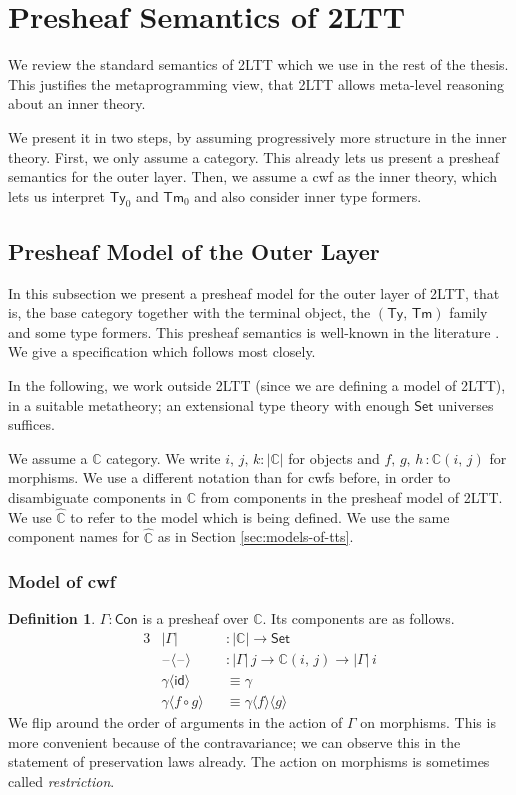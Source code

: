 \documentclass[12pt,a4paper,twoside,openany]{book}
\theoremstyle{remark}
\theoremstyle{definition}
\newtheorem{mydefinition}{Definition}
\theoremstyle{theorem}
\newcommand{\mbb}[1]{\mathbb{#1}}
\newcommand{\id}{\mathsf{id}}
\newcommand{\Con}{\mathsf{Con}}
\newcommand{\Tm}{\mathsf{Tm}}
\newcommand{\Ty}{\mathsf{Ty}}
\newcommand{\blank}{\mathord{\hspace{1pt}\text{--}\hspace{1pt}}}
\newcommand{\Set}{\mathsf{Set}}
\newcommand{\mbbC}{\mbb{C}}
\newcommand{\hmbbC}{\hat{\mbb{C}}}
\newcommand{\lab}{\langle}
\newcommand{\rab}{\rangle}
\begin{document}
\section{Presheaf Semantics of 2LTT}


We review the standard semantics of 2LTT which we use in the rest of the
thesis. This justifies the metaprogramming view, that 2LTT allows meta-level
reasoning about an inner theory.

We present it in two steps, by assuming progressively more structure in the inner
theory. First, we only assume a category. This already lets us present a
presheaf semantics for the outer layer. Then, we assume a cwf as the inner
theory, which lets us interpret $\Ty_0$ and $\Tm_0$ and also consider inner type
formers.

\subsection{Presheaf Model of the Outer Layer}

In this subsection we present a presheaf model for the outer layer of 2LTT, that
is, the base category together with the terminal object, the $(\Ty,\,\Tm)$
family and some type formers. This presheaf semantics is well-known in the
literature \cite{Hofmann97syntaxand}. We give a specification which follows
\cite{huber-thesis} most closely.

In the following, we work outside 2LTT (since we are defining a model of 2LTT),
in a suitable metatheory; an extensional type theory with enough $\Set$
universes suffices.

We assume a $\mbbC$ category. We write $i,\,j,\,k : |\mbbC|$ for objects and
$f,\,g,\,h\,: \mbbC(i,\,j)$ for morphisms. We use a different notation than for
cwfs before, in order to disambiguate components in $\mbbC$ from components in
the presheaf model of 2LTT. We use $\hmbbC$ to refer to the model which is being
defined. We use the same component names for $\hmbbC$ as in Section
\ref{sec:models-of-tts}.

\subsubsection{Model of cwf}

\begin{mydefinition}
$\Gamma : \Con$ is a presheaf over $\mbbC$. Its components
are as follows.
\begin{alignat*}{3}
  & |\Gamma|             &&: |\mbbC| \to \Set \\
  & \blank\lab\blank\rab &&: |\Gamma|\,j \to \mbbC(i,\,j) \to |\Gamma|\,i\\
  & \gamma\lab\id\rab &&\equiv \gamma \\
  & \gamma\lab f\circ g\rab &&\equiv \gamma \lab f \rab \lab g \rab
\end{alignat*}
We flip around the order of arguments in the action of $\Gamma$ on
morphisms. This is more convenient because of the contravariance; we can observe
this in the statement of preservation laws already. The action on morphisms is
sometimes called \emph{restriction}.
\end{mydefinition}
\end{document}
